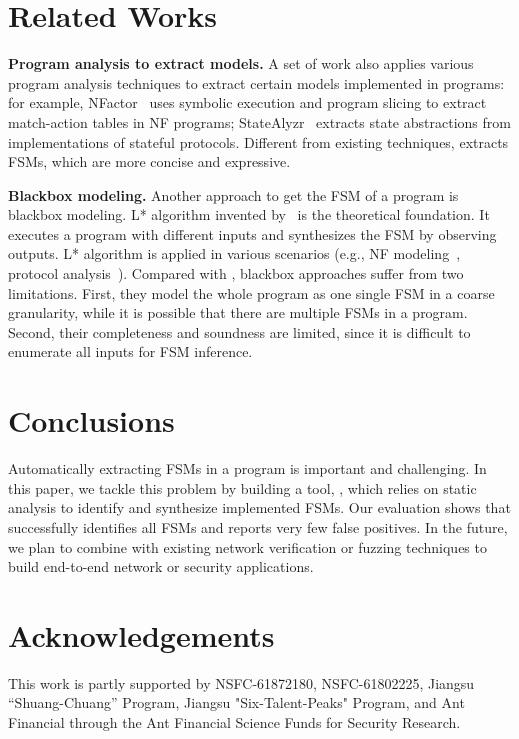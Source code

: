 \section{Related Works}
\label{sec:related}

\noindent\textbf{Program analysis to extract models.}
A set of work also applies various program analysis techniques
to extract certain models implemented in programs:
for example, NFactor~\cite{wu2016automatic}
uses symbolic execution and program slicing to extract match-action
tables in NF programs;
StateAlyzr~\cite{khalid2016paving} extracts state abstractions
from implementations of stateful protocols.
Different from existing techniques, \Tool{} extracts FSMs,
which are more concise and expressive.

\noindent\textbf{Blackbox modeling.}
Another approach to get the FSM of a program is blackbox modeling.
L* algorithm invented by~\citet{angluin1987learning}
is the theoretical foundation.
It executes a program with different inputs and
synthesizes the FSM by observing outputs.
L* algorithm is applied in various scenarios
(e.g., NF modeling~\cite{moon2019alembic},
protocol analysis~\cite{cho2011mace}).
Compared with \Tool{}, blackbox approaches suffer from two limitations.
First, they model the whole program as one single FSM in a coarse granularity,
while it is possible that there are multiple FSMs in a program.
Second, their completeness and soundness are limited,
since it is difficult to enumerate all inputs for
FSM inference.



\section{Conclusions}

Automatically extracting FSMs in a program is important
and challenging.
In this paper, we tackle this problem by building a tool, \Tool{},
which relies on static analysis to identify and synthesize implemented FSMs.
Our evaluation shows that \Tool{} successfully identifies all FSMs and
reports very few false positives.
In the future, we plan to combine \Tool{} with existing network verification
or fuzzing techniques to build end-to-end network or security applications.



\section{Acknowledgements}
This work is partly supported by NSFC-61872180, NSFC-61802225, Jiangsu “Shuang-Chuang” Program, Jiangsu "Six-Talent-Peaks" Program, and Ant
Financial through the Ant Financial Science Funds for Security Research.




